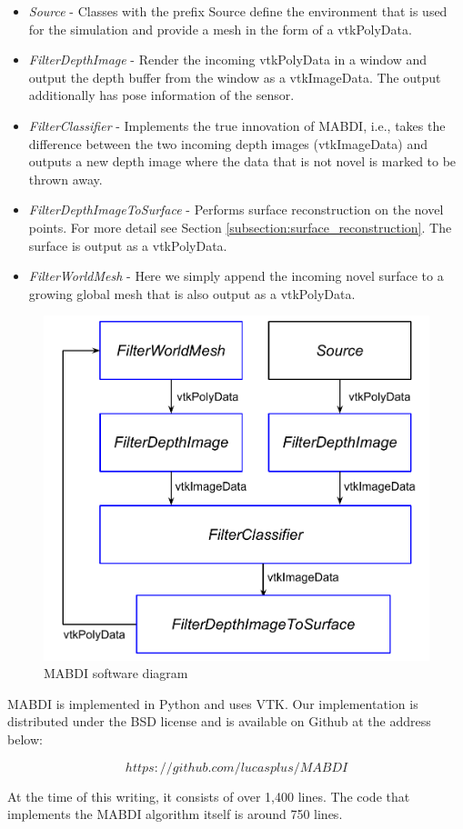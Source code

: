 \begin{sloppypar}
\begin{itemize}
    \item  \textit{Source} - Classes with the prefix Source define the
    environment that is used for the simulation and provide a mesh in the form
    of a vtkPolyData.
    \item \textit{FilterDepthImage} - Render the incoming vtkPolyData in a
    window and output the depth buffer from the window as a vtkImageData. The
    output additionally has pose information of the sensor.
    \item \textit{FilterClassifier} - Implements the true innovation of MABDI,
    i.e., takes the difference between the two incoming depth images
    (vtkImageData) and outputs a new depth image where the data that is not
    novel is marked to be thrown away.
    \item \textit{FilterDepthImageToSurface} - Performs surface reconstruction
    on the novel points. For more detail see Section
    \ref{subsection:surface_reconstruction}. The surface is output as a
    vtkPolyData.
    \item \textit{FilterWorldMesh} - Here we simply append the incoming novel
    surface to a growing global mesh that is also output as a vtkPolyData.
\end{itemize}
\end{sloppypar}

\begin{figure}[b]%
\centering
\includegraphics[width=.75\textwidth]{figures/approach_software_diagram.pdf}
\caption{MABDI software diagram}
\label{fig:software}
\end{figure}

MABDI is implemented in Python and uses VTK. Our implementation is distributed
under the BSD license and is available on Github at the address below:

$$
https://github.com/lucasplus/MABDI
$$

At the time of this writing, it consists of over 1,400 lines. The code that
implements the MABDI algorithm itself is around 750 lines.
